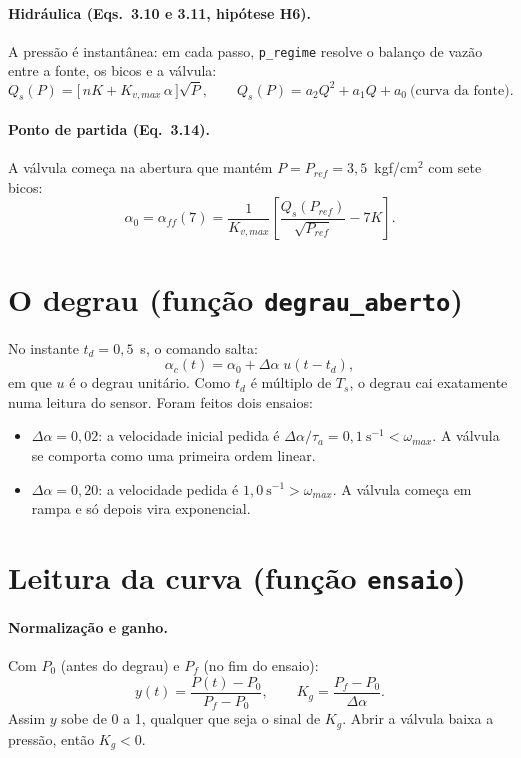 \documentclass[11pt,a4paper]{article}
\newcommand{\cod}[1]{\texttt{\color{black!75}#1}}
\begin{document}
\paragraph{Hidráulica (Eqs.~3.10 e 3.11, hipótese H6).} A pressão é instantânea: em cada passo,
\cod{p\_regime} resolve o balanço de vazão entre a fonte, os bicos e a válvula:
\begin{equation}
  Q_s(P) = \bigl[\,n K + K_{v,max}\,\alpha\,\bigr]\sqrt{P},
  \qquad Q_s(P) = a_2 Q^2 + a_1 Q + a_0 \ \text{(curva da fonte)} .
\end{equation}

\paragraph{Ponto de partida (Eq.~3.14).} A válvula começa na abertura que mantém
$P = P_{ref} = 3{,}5$~kgf/cm$^2$ com sete bicos:
\begin{equation}
  \alpha_0 = \alpha_{ff}(7) = \frac{1}{K_{v,max}}\left[\frac{Q_s(P_{ref})}{\sqrt{P_{ref}}} - 7K\right].
\end{equation}

\section{O degrau (função \cod{degrau\_aberto})}

No instante $t_d = 0{,}5$~s, o comando salta:
\begin{equation}
  \alpha_c(t) = \alpha_0 + \Delta\alpha\; u(t - t_d),
\end{equation}
em que $u$ é o degrau unitário. Como $t_d$ é múltiplo de $T_s$, o degrau cai exatamente numa
leitura do sensor. Foram feitos dois ensaios:
\begin{itemize}
  \item $\Delta\alpha = 0{,}02$: a velocidade inicial pedida é $\Delta\alpha/\tau_a = 0{,}1\ \text{s}^{-1} < \omega_{max}$.
        A válvula se comporta como uma primeira ordem linear.
  \item $\Delta\alpha = 0{,}20$: a velocidade pedida é $1{,}0\ \text{s}^{-1} > \omega_{max}$.
        A válvula começa em rampa e só depois vira exponencial.
\end{itemize}

\section{Leitura da curva (função \cod{ensaio})}

\paragraph{Normalização e ganho.} Com $P_0$ (antes do degrau) e $P_f$ (no fim do ensaio):
\begin{equation}
  y(t) = \frac{P(t) - P_0}{P_f - P_0},\qquad
  K_g = \frac{P_f - P_0}{\Delta\alpha}.
\end{equation}
Assim $y$ sobe de 0 a 1, qualquer que seja o sinal de $K_g$. Abrir a válvula baixa a pressão,
então $K_g < 0$.
\end{document}
